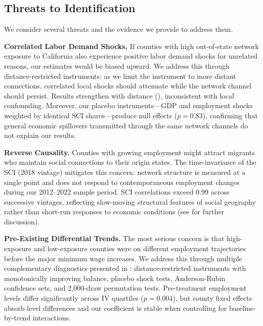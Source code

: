 \documentclass[12pt]{article}
\begin{document}
\subsection{Threats to Identification}

We consider several threats and the evidence we provide to address them.

\textbf{Correlated Labor Demand Shocks.} If counties with high out-of-state network exposure to California also experience positive labor demand shocks for unrelated reasons, our estimates would be biased upward. We address this through distance-restricted instruments: as we limit the instrument to more distant connections, correlated local shocks should attenuate while the network channel should persist. Results strengthen with distance (), inconsistent with local confounding. Moreover, our placebo instruments---GDP and employment shocks weighted by identical SCI shares---produce null effects ($p = 0.83$), confirming that general economic spillovers transmitted through the same network channels do not explain our results.

\textbf{Reverse Causality.} Counties with growing employment might attract migrants who maintain social connections to their origin states. The time-invariance of the SCI (2018 vintage) mitigates this concern: network structure is measured at a single point and does not respond to contemporaneous employment changes during our 2012--2022 sample period. SCI correlations exceed 0.99 across successive vintages, reflecting slow-moving structural features of social geography rather than short-run responses to economic conditions (see  for further discussion).

\textbf{Pre-Existing Differential Trends.} The most serious concern is that high-exposure and low-exposure counties were on different employment trajectories before the major minimum wage increases. We address this through multiple complementary diagnostics presented in : distance-restricted instruments with monotonically improving balance, placebo shock tests, Anderson-Rubin confidence sets, and 2,000-draw permutation tests. Pre-treatment employment levels differ significantly across IV quartiles ($p = 0.004$), but county fixed effects absorb level differences and our coefficient is stable when controlling for baseline-by-trend interactions.


\end{document}
